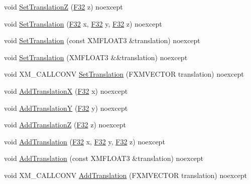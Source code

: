 \begin{DoxyCompactItemize}
void \hyperlink{structmage_1_1_transform_a71009b20361c01c0ffbd981986d323e8}{Set\+TranslationZ} (\hyperlink{namespacemage_aa97e833b45f06d60a0a9c4fc22ae02c0}{F32} z) noexcept
\item 
void \hyperlink{structmage_1_1_transform_afb794877f9b538b5ce4b55e4cd8852f0}{Set\+Translation} (\hyperlink{namespacemage_aa97e833b45f06d60a0a9c4fc22ae02c0}{F32} x, \hyperlink{namespacemage_aa97e833b45f06d60a0a9c4fc22ae02c0}{F32} y, \hyperlink{namespacemage_aa97e833b45f06d60a0a9c4fc22ae02c0}{F32} z) noexcept
\item 
void \hyperlink{structmage_1_1_transform_aa20a954eea7d0ae56978cb8945d94d60}{Set\+Translation} (const X\+M\+F\+L\+O\+A\+T3 \&translation) noexcept
\item 
void \hyperlink{structmage_1_1_transform_a929668342773398898fa76449da83583}{Set\+Translation} (X\+M\+F\+L\+O\+A\+T3 \&\&translation) noexcept
\item 
void X\+M\+\_\+\+C\+A\+L\+L\+C\+O\+NV \hyperlink{structmage_1_1_transform_a0c93ec5483091d4be508e11d5c05579e}{Set\+Translation} (F\+X\+M\+V\+E\+C\+T\+OR translation) noexcept
\item 
void \hyperlink{structmage_1_1_transform_a1161f8c965e071dd59f1780d7a06952b}{Add\+TranslationX} (\hyperlink{namespacemage_aa97e833b45f06d60a0a9c4fc22ae02c0}{F32} x) noexcept
\item 
void \hyperlink{structmage_1_1_transform_abf9253ddafad2725ef6c6e2b4bd44b35}{Add\+TranslationY} (\hyperlink{namespacemage_aa97e833b45f06d60a0a9c4fc22ae02c0}{F32} y) noexcept
\item 
void \hyperlink{structmage_1_1_transform_a2554a3af167bb8ae9f4724921e6a3596}{Add\+TranslationZ} (\hyperlink{namespacemage_aa97e833b45f06d60a0a9c4fc22ae02c0}{F32} z) noexcept
\item 
void \hyperlink{structmage_1_1_transform_ae786c4135de007be509b5d5fe9d1a60b}{Add\+Translation} (\hyperlink{namespacemage_aa97e833b45f06d60a0a9c4fc22ae02c0}{F32} x, \hyperlink{namespacemage_aa97e833b45f06d60a0a9c4fc22ae02c0}{F32} y, \hyperlink{namespacemage_aa97e833b45f06d60a0a9c4fc22ae02c0}{F32} z) noexcept
\item 
void \hyperlink{structmage_1_1_transform_a32736bfdab941254501ee9a4cc7fdb0e}{Add\+Translation} (const X\+M\+F\+L\+O\+A\+T3 \&translation) noexcept
\item 
void X\+M\+\_\+\+C\+A\+L\+L\+C\+O\+NV \hyperlink{structmage_1_1_transform_a931911a2ef61b9a74be444e4c65ee46a}{Add\+Translation} (F\+X\+M\+V\+E\+C\+T\+OR translation) noexcept
\item 

\end{DoxyCompactItemize}

